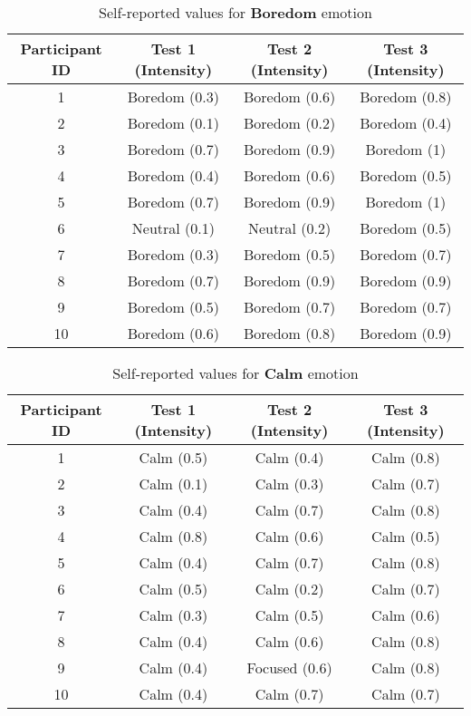 \begin{table}[H]
    \centering
    \caption{Self-reported values for \textbf{Boredom} emotion}
    \label{tab:boredom-self-report}
    \begin{tabular}{|c|c|c|c|}
    \hline
    \textbf{Participant ID} & \textbf{Test 1 (Intensity)} & \textbf{Test 2 (Intensity)} & \textbf{Test 3 (Intensity)} \\
    \hline
    1 & Boredom (0.3) & Boredom (0.6) & Boredom (0.8) \\
    2 & Boredom (0.1) & Boredom (0.2) & Boredom (0.4) \\
    3 & Boredom (0.7) & Boredom (0.9) & Boredom (1) \\
    4 & Boredom (0.4) & Boredom (0.6) & Boredom (0.5) \\
    5 & Boredom (0.7) & Boredom (0.9) & Boredom (1) \\
    6 & Neutral (0.1) & Neutral (0.2) & Boredom (0.5) \\
    7 & Boredom (0.3) & Boredom (0.5) & Boredom (0.7) \\
    8 & Boredom (0.7) & Boredom (0.9) & Boredom (0.9) \\
    9 & Boredom (0.5) & Boredom (0.7) & Boredom (0.7) \\
    10 & Boredom (0.6) & Boredom (0.8) & Boredom (0.9) \\
    \hline
    \end{tabular}
\end{table}

\begin{table}[H]
    \centering
    \caption{Self-reported values for \textbf{Calm} emotion}
    \label{tab:calm-self-report}
    \begin{tabular}{|c|c|c|c|}
    \hline
    \textbf{Participant ID} & \textbf{Test 1 (Intensity)} & \textbf{Test 2 (Intensity)} & \textbf{Test 3 (Intensity)} \\
    \hline
    1 & Calm (0.5) & Calm (0.4) & Calm (0.8) \\
    2 & Calm (0.1) & Calm (0.3) & Calm (0.7) \\
    3 & Calm (0.4) & Calm (0.7) & Calm (0.8) \\
    4 & Calm (0.8) & Calm (0.6) & Calm (0.5) \\
    5 & Calm (0.4) & Calm (0.7) & Calm (0.8) \\
    6 & Calm (0.5) & Calm (0.2) & Calm (0.7) \\
    7 & Calm (0.3) & Calm (0.5) & Calm (0.6) \\
    8 & Calm (0.4) & Calm (0.6) & Calm (0.8) \\
    9 & Calm (0.4) & Focused (0.6) & Calm (0.8) \\
    10 & Calm (0.4) & Calm (0.7) & Calm (0.7) \\
    \hline
    \end{tabular}
\end{table}


